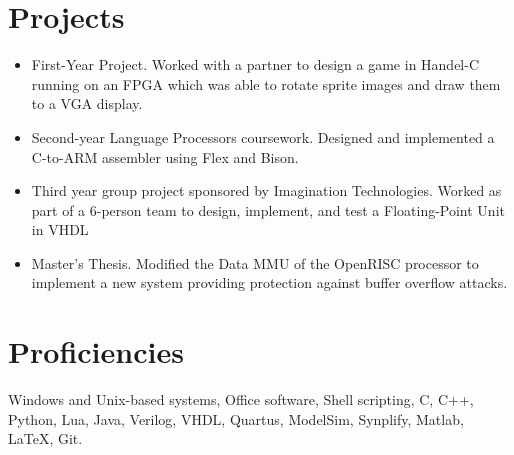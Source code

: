 \documentclass[a4paper, oneside, final]{scrartcl} %
\begin{document}
\begin{center}

\section{Projects}
\begin{itemize}
  \setlength{\itemsep}{0.3em}%
  \setlength{\parskip}{0em}
\item
First-Year Project. Worked with a partner to design a game in Handel-C
running on an FPGA which was able to rotate sprite images and draw
them to a VGA display.

\item
Second-year Language Processors coursework. Designed and implemented a
C-to-ARM assembler using Flex and Bison.

\item
Third year group project sponsored by Imagination Technologies. Worked
as part of a 6-person team to design, implement, and test a
Floating-Point Unit in VHDL

\item
Master's Thesis. Modified the Data MMU of the OpenRISC processor to
implement a new system providing protection against buffer overflow
attacks.
\end{itemize}


\section{Proficiencies}


\begin{flushleft}
Windows and Unix-based systems, Office software, Shell scripting, C,
C++, Python, Lua, Java, Verilog, VHDL, Quartus, ModelSim, Synplify,
Matlab, \LaTeX, Git.
\end{flushleft}


\end{center}
\end{document}
